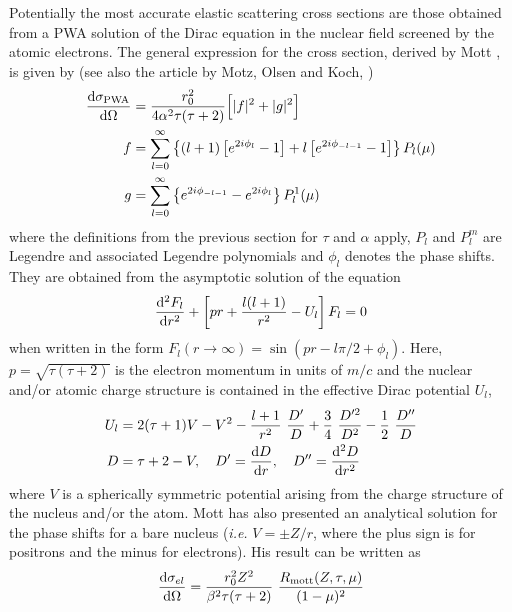 Potentially the most accurate elastic scattering cross sections
are those obtained from a PWA solution of the Dirac equation
in the nuclear field screened by the atomic electrons.
The general expression for the cross section, derived by Mott \cite{Mo29},
is given by (see also the article by Motz, Olsen and Koch, \cite{Mo64})
\begin{equation}
\label{mott1}
\begin{split}
{{\rm d}\sigma_{\rm PWA} \over {\rm d}\Omega} & = {r_0^2 \over 4 \alpha^2 \tau
(\tau + 2) } \Big[ |f|^2 + |g|^2 \Big] \\
f & = \sum_{l=0}^\infty \left\{ (l+1) \left[ e^{2 i \phi_l} - 1 \right]
+ l \left[ e^{2 i \phi_{-l-1}} - 1 \right] \right\} P_l(\mu) \\
g & = \sum_{l=0}^\infty \left\{ e^{2 i \phi_{-l-1}} - e^{2 i \phi_l} \right\}
P_l^1(\mu)
\end{split}
\end{equation}
where the definitions from the previous section for $\tau$ and $\alpha$
apply, $P_l$ and $P_l^m$ are Legendre and associated Legendre polynomials
and $\phi_l$ denotes the phase shifts. They are obtained from
the asymptotic solution of the equation
\begin{equation}
\label{mott2}
{{\rm d}^2 F_l \over {\rm d}r^2} + \left[ p r + {l (l+1) \over r^2}
- U_l \right] F_l = 0
\end{equation}
when written in the form $F_l(r \to \infty) = \sin(p r - l \pi/2 + \phi_l)$.
Here, $p = \sqrt{\tau (\tau+2)}$ is the electron momentum in units
of $m/c$ and the nuclear and/or atomic charge structure
is contained in the effective Dirac potential $U_l$,
\begin{equation}
\label{mott3}
\begin{split}
U_l & = 2 (\tau + 1) V - V^2 - {l+1 \over r^2}~{D' \over D} +
\frac{3}{4}~{D^{\prime 2} \over D^2} - \frac{1}{2}~
\frac{D^{\prime \prime}}{D} \\
D & = \tau + 2 - V, \quad D' = {{\rm d} D \over {\rm d}r}, \quad
D^{\prime \prime} = {{\rm d}^2 D \over {\rm d}r^2}
\end{split}
\end{equation}
where $V$ is a spherically symmetric potential arising from the
charge structure of the nucleus and/or the atom.
Mott has also presented \cite{Mo32} an analytical solution for the
phase shifts for a bare nucleus ({\em i.e.} $V = \pm Z/r$, where
the plus sign is for positrons and the minus
for electrons). His result can be written as \cite{Mo64}
\begin{equation}
{{\rm d}\sigma_{el} \over {\rm d}\Omega} =
{r_0^2 Z^2 \over
\beta^2 \tau (\tau + 2) }~{R_{\rm mott}(Z,\tau,\mu) \over (1 - \mu )^2}
\end{equation}
